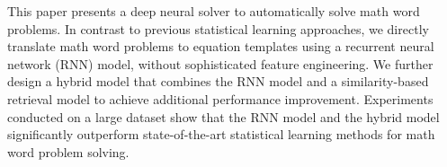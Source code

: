 This paper presents a deep neural solver to automatically solve math word problems. In contrast to previous statistical learning approaches, we directly translate math word problems to equation templates using a recurrent neural network (RNN) model, without sophisticated feature engineering. We further design a hybrid model that combines the RNN model and a similarity-based retrieval model to achieve additional performance improvement. Experiments conducted on a large dataset show that the RNN model and the hybrid model significantly outperform state-of-the-art statistical learning methods for math word problem solving.
